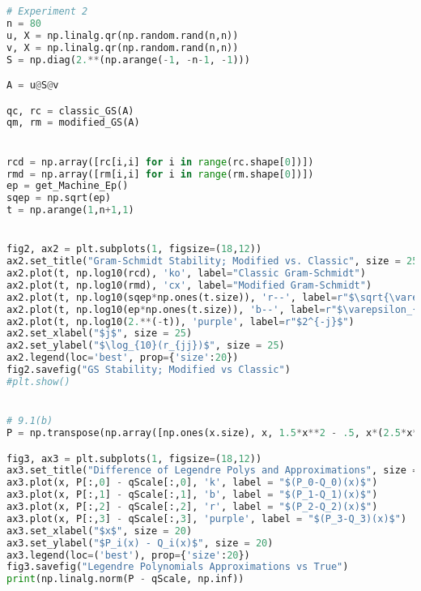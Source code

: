 \documentclass{article}
\begin{document}
\begin{lstlisting}[language=python]
# Experiment 2
n = 80
u, X = np.linalg.qr(np.random.rand(n,n))
v, X = np.linalg.qr(np.random.rand(n,n))
S = np.diag(2.**(np.arange(-1, -n-1, -1)))

A = u@S@v

qc, rc = classic_GS(A)
qm, rm = modified_GS(A)


rcd = np.array([rc[i,i] for i in range(rc.shape[0])])
rmd = np.array([rm[i,i] for i in range(rm.shape[0])])
ep = get_Machine_Ep()
sqep = np.sqrt(ep)
t = np.arange(1,n+1,1)


fig2, ax2 = plt.subplots(1, figsize=(18,12))
ax2.set_title("Gram-Schmidt Stability; Modified vs. Classic", size = 25)
ax2.plot(t, np.log10(rcd), 'ko', label="Classic Gram-Schmidt")
ax2.plot(t, np.log10(rmd), 'cx', label="Modified Gram-Schmidt")
ax2.plot(t, np.log10(sqep*np.ones(t.size)), 'r--', label=r"$\sqrt{\varepsilon_{machine}}$")
ax2.plot(t, np.log10(ep*np.ones(t.size)), 'b--', label=r"$\varepsilon_{machine}$")
ax2.plot(t, np.log10(2.**(-t)), 'purple', label=r"$2^{-j}$")
ax2.set_xlabel("$j$", size = 25)
ax2.set_ylabel("$\log_{10}(r_{jj})$", size = 25)
ax2.legend(loc='best', prop={'size':20})
fig2.savefig("GS Stability; Modified vs Classic")
#plt.show()


# 9.1(b)
P = np.transpose(np.array([np.ones(x.size), x, 1.5*x**2 - .5, x*(2.5*x**2 - 1.5)]))

fig3, ax3 = plt.subplots(1, figsize=(18,12))
ax3.set_title("Difference of Legendre Polys and Approximations", size = 30)
ax3.plot(x, P[:,0] - qScale[:,0], 'k', label = "$(P_0-Q_0)(x)$")
ax3.plot(x, P[:,1] - qScale[:,1], 'b', label = "$(P_1-Q_1)(x)$")
ax3.plot(x, P[:,2] - qScale[:,2], 'r', label = "$(P_2-Q_2)(x)$")
ax3.plot(x, P[:,3] - qScale[:,3], 'purple', label = "$(P_3-Q_3)(x)$")
ax3.set_xlabel("$x$", size = 20)
ax3.set_ylabel("$P_i(x) - Q_i(x)$", size = 20)
ax3.legend(loc=('best'), prop={'size':20})
fig3.savefig("Legendre Polynomials Approximations vs True")
print(np.linalg.norm(P - qScale, np.inf))
\end{lstlisting}
\end{document}
